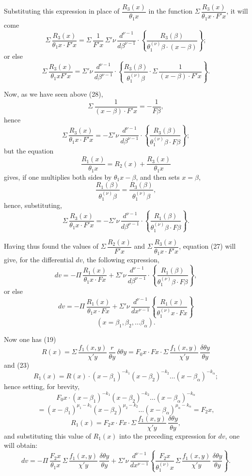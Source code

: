 \documentclass{article}
\begin{document}
Substituting this expression in place of $\dfrac{R_3(x)}{\theta_1 x}$ in the function $\Sigma\,\dfrac{R_3(x)}{\theta_1 x \cdot F' x}$, it will come
\[ \Sigma\,\frac{R_3(x)}{\theta_1 x \cdot F' x} = \Sigma\,\frac{1}{F' x}\,\Sigma' \nu\,\frac{d^{\nu-1}}{d\beta^{\nu-1}} \cdot \left\{ \frac{R_3(\beta)}{\theta_1^{(\nu)}\beta \cdot (x-\beta)} \right\}; \tag{30} \]
or else
\[ \Sigma\,\frac{R_3(x)}{\theta_1 x F' x} = \Sigma' \nu\,\frac{d^{\nu-1}}{d\beta^{\nu-1}} \cdot \left\{ \frac{R_3(\beta)}{\theta_1^{(\nu)}\beta} \cdot \Sigma\,\frac{1}{(x-\beta) \cdot F' x} \right\}. \tag{31} \]

Now, as we have seen above (28),
\[ \Sigma\,\frac{1}{(x-\beta) \cdot F' x} = -\frac{1}{F\beta}, \]
hence
\[ \Sigma\,\frac{R_3(x)}{\theta_1 x \cdot F' x} = -\Sigma' \nu\,\frac{d^{\nu-1}}{d\beta^{\nu-1}} \cdot \left\{ \frac{R_3(\beta)}{\theta_1^{(\nu)}\beta \cdot F\beta} \right\}; \]
but the equation
\[ \frac{R_1(x)}{\theta_1 x} = R_2(x) + \frac{R_3(x)}{\theta_1 x} \]
gives, if one multiplies both sides by $\theta_1 x - \beta$, and then sets $x = \beta$,
\[ \frac{R_1(\beta)}{\theta_1^{(\nu)}\beta} = \frac{R_3(\beta)}{\theta_1^{(\nu)}\beta}, \]
hence, substituting,
\[ \Sigma\,\frac{R_3(x)}{\theta_1 x \cdot F' x} = -\Sigma' \nu\,\frac{d^{\nu-1}}{d\beta^{\nu-1}} \cdot \left\{ \frac{R_1(\beta)}{\theta_1^{(\nu)}\beta \cdot F\beta} \right\}. \tag{32} \]

Having thus found the values of $\Sigma\,\dfrac{R_2(x)}{F' x}$ and $\Sigma\,\dfrac{R_3(x)}{\theta_1 x \cdot F' x}$, equation (27) will give, for the differential $dv$, the following expression,
\[ dv = -\Pi\,\frac{R_1(x)}{\theta_1 x \cdot F x} + \Sigma' \nu\,\frac{d^{\nu-1}}{d\beta^{\nu-1}} \cdot \left\{ \frac{R_1(\beta)}{\theta_1^{(\nu)}\beta \cdot F\beta} \right\}, \tag{33} \]
or else
\[ dv = -\Pi\,\frac{R_1(x)}{\theta_1 x \cdot F x} + \Sigma' \nu\,\frac{d^{\nu-1}}{dx^{\nu-1}} \left\{ \frac{R_1(x)}{\theta_1^{(\nu)} x \cdot F x} \right\} \tag{34} \]
\[ (x = \beta_1, \beta_2, \ldots \beta_\alpha). \]

Now one has (19)
\[ R(x) = \Sigma\,\frac{f_1(x, y)}{\chi' y}\,\frac{r}{\theta y}\,\delta\theta y = F_0 x \cdot F x \cdot \Sigma\,\frac{f_1(x, y)}{\chi' y}\,\frac{\delta\theta y}{\theta y} \]
and (23)
\[ R_1(x) = R(x) \cdot (x-\beta_1)^{-k_1}(x-\beta_2)^{-k_2} \ldots (x-\beta_\alpha)^{-k_\alpha}; \]
hence setting, for brevity,
\[ F_0 x \cdot (x-\beta_1)^{-k_1}(x-\beta_2)^{-k_2} \ldots (x-\beta_\alpha)^{-k_\alpha} \]
\[ = (x-\beta_1)^{\mu_1-k_1}(x-\beta_2)^{\mu_2-k_2} \ldots (x-\beta_\alpha)^{\mu_\alpha-k_\alpha} = F_2 x, \tag{35} \]
\[ R_1(x) = F_2 x \cdot F x \cdot \Sigma\,\frac{f_1(x, y)}{\chi' y}\,\frac{\delta\theta y}{\theta y}, \]
and substituting this value of $R_1(x)$ into the preceding expression for $dv$, one will obtain:
\[ dv = -\Pi\,\frac{F_2 x}{\theta_1 x}\,\Sigma\,\frac{f_1(x, y)}{\chi' y}\,\frac{\delta\theta y}{\theta y} + \Sigma' \nu\,\frac{d^{\nu-1}}{dx^{\nu-1}} \left\{ \frac{F_2 x}{\theta_1^{(\nu)} x}\,\Sigma\,\frac{f_1(x, y)}{\chi' y}\,\frac{\delta\theta y}{\theta y} \right\}. \tag{36} \]
\end{document}
